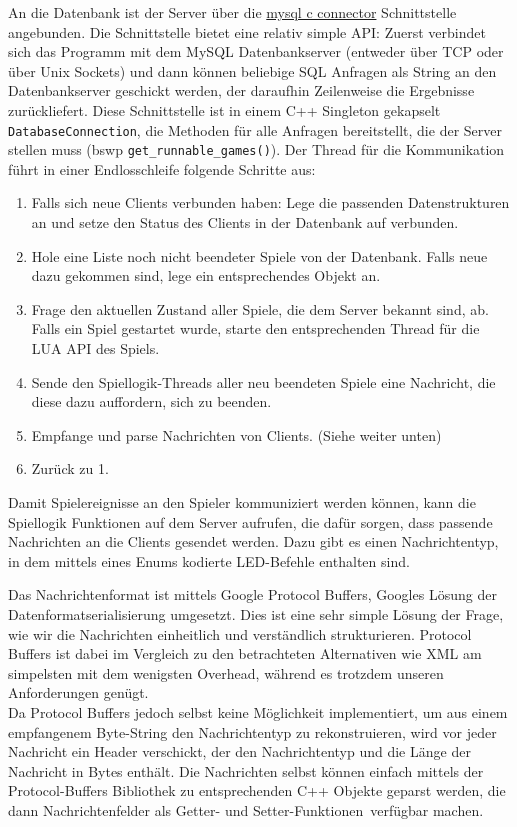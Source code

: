 An die Datenbank ist der Server über die \href{https://dev.mysql.com/doc/connector-c/en/connector-c-introduction.html}{mysql c connector} Schnittstelle angebunden. Die Schnittstelle bietet eine relativ simple API: Zuerst verbindet sich das Programm mit dem MySQL Datenbankserver (entweder über TCP oder über Unix Sockets) und dann können beliebige SQL Anfragen als String an den Datenbankserver geschickt werden, der daraufhin Zeilenweise die Ergebnisse zurückliefert.
Diese Schnittstelle ist in einem C++ Singleton gekapselt \texttt{DatabaseConnection}, die Methoden für alle Anfragen
bereitstellt, die der Server stellen muss (bswp \texttt{get\_runnable\_games()}). 
\newline
\newline
Der Thread für die Kommunikation führt in einer Endlosschleife folgende Schritte aus:
\begin{enumerate}
    \item Falls sich neue Clients verbunden haben: Lege die passenden Datenstrukturen an und setze den Status des Clients in der Datenbank auf verbunden.
    \item Hole eine Liste noch nicht beendeter Spiele von der Datenbank. Falls neue dazu gekommen sind, lege ein entsprechendes Objekt an.
    \item Frage den aktuellen Zustand aller Spiele, die dem Server bekannt sind, ab. Falls ein Spiel gestartet wurde, starte den entsprechenden Thread für die LUA API des Spiels.
    \item Sende den Spiellogik-Threads aller neu beendeten Spiele eine Nachricht, die diese dazu auffordern, sich zu beenden.
    \item Empfange und parse Nachrichten von Clients. (Siehe weiter unten)
    \item Zurück zu 1.
\end{enumerate}

Damit Spielereignisse an den Spieler kommuniziert werden können, kann die Spiellogik Funktionen auf dem Server aufrufen, die dafür sorgen, dass passende Nachrichten an die Clients gesendet werden. Dazu gibt es einen Nachrichtentyp, in dem mittels eines Enums kodierte LED-Befehle enthalten sind. 

Das Nachrichtenformat ist mittels Google Protocol Buffers, Googles Lösung der Datenformatserialisierung umgesetzt. Dies ist eine sehr simple Lösung der Frage, wie wir die Nachrichten einheitlich und verständlich strukturieren. Protocol Buffers ist dabei im Vergleich zu den betrachteten Alternativen wie XML am simpelsten mit dem wenigsten Overhead, während es trotzdem unseren Anforderungen genügt.\\
 Da Protocol Buffers jedoch selbst keine Möglichkeit
implementiert, um aus einem empfangenem Byte-String den Nachrichtentyp zu rekonstruieren, wird vor jeder Nachricht
ein Header verschickt, der den Nachrichtentyp und die Länge der Nachricht in Bytes enthält.
Die Nachrichten selbst können einfach mittels der Protocol-Buffers Bibliothek zu entsprechenden C++ Objekte geparst werden, die dann Nachrichtenfelder als \glqq Getter- und Setter-Funktionen\grqq \, verfügbar machen.

